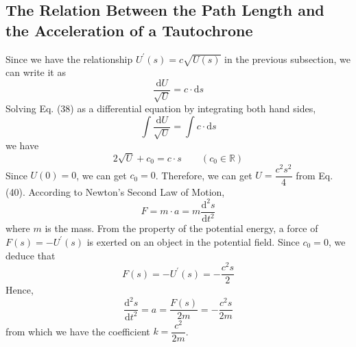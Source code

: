 \documentclass[12pt]{report}
\begin{document}
\subsection{The Relation Between the Path Length and the Acceleration of a Tautochrone}
Since we have the relationship $U^{'}(s)=c\sqrt{U(s)}$ in the previous subsection, we can write it as
\begin{equation}
    \dfrac{\mathrm{d}U}{\sqrt{U}}=c\cdot\mathrm{d}s
\end{equation}
Solving Eq. (38) as a differential equation by integrating both hand sides,
\begin{equation}
    \int\dfrac{\mathrm{d}U}{\sqrt{U}}=\int c\cdot\mathrm{d}s
\end{equation}
we have
\begin{equation}
    2\sqrt{U}+c_0=c\cdot s\qquad(c_0\in\mathbb{R})
\end{equation}
Since $U(0)=0$, we can get $c_0=0$. Therefore, we can get $U=\dfrac{c^2s^2}{4}$ from Eq. (40). According to Newton's Second Law of Motion,
\begin{equation}
    F=m\cdot a=m\dfrac{\mathrm{d}^2s}{\mathrm{d}t^2}
\end{equation}
where $m$ is the mass. From the property of the potential energy, a force of $F(s)=-U^{'}(s)$ is exerted on an object in the potential field. Since $c_0=0$, we deduce that
\begin{equation}
    F(s)=-U^{'}(s)=-\dfrac{c^2s}{2}
\end{equation}
Hence,
\begin{equation}
    \dfrac{\mathrm{d}^2s}{\mathrm{d}t^2}=a=\dfrac{F(s)}{2m}=-\dfrac{c^2s}{2m}
\end{equation}
from which we have the coefficient $k=\dfrac{c^2}{2m}$.
\end{document}
